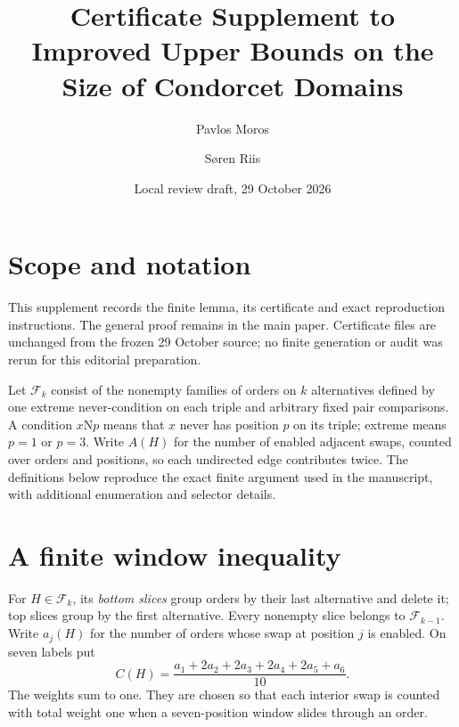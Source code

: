 \documentclass[11pt,letterpaper]{article}
\title{Certificate Supplement to\\
Improved Upper Bounds on the Size of Condorcet Domains}
\author{Pavlos Moros \and S\o ren Riis}
\date{Local review draft, 29 October 2026}
\theoremstyle{remark}\newtheorem{remark}[theorem]{Remark}
\newcommand{\F}{\mathcal F}
\newcommand{\nc}[2]{#1\mathrm N#2}
\begin{document}
\maketitle
\section{Scope and notation}
This supplement records the finite lemma, its certificate and exact
reproduction instructions. The general proof remains in the main paper.
Certificate files are unchanged from the frozen 29 October source;
no finite generation or audit was rerun for this editorial preparation.

Let $\F_k$ consist of the nonempty families of orders on $k$ alternatives
defined by one extreme never-condition on each triple and arbitrary
fixed pair comparisons. A condition $\nc xp$ means that $x$ never has
position $p$ on its triple; extreme means $p=1$ or $p=3$.
Write $A(H)$ for the number of enabled adjacent swaps, counted over
orders and positions, so each undirected edge contributes twice.
The definitions below reproduce the exact finite argument used in the
manuscript, with additional enumeration and selector details.

\section{A finite window inequality}\label{sec:finite}

For $H\in\F_k$, its \emph{bottom slices} group orders by their last
alternative and delete it; top slices group by the first alternative.
Every nonempty slice belongs to $\F_{k-1}$. Write $a_j(H)$ for the
number of orders whose swap at position $j$ is enabled. On seven labels put
\begin{equation}\label{eq:cost}
 C(H)=\frac{a_1+2a_2+2a_3+2a_4+2a_5+a_6}{10}.
\end{equation}
The weights sum to one. They are chosen so that each interior swap is
counted with total weight one when a seven-position window slides
through an order.
\end{document}
